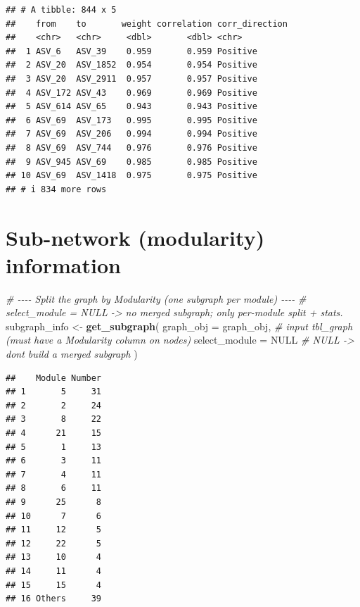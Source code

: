 \documentclass[
]{book}
\newenvironment{Shaded}{\begin{snugshade}}{\end{snugshade}}
\newcommand{\AttributeTok}[1]{\textcolor[rgb]{0.13,0.29,0.53}{#1}}
\newcommand{\CommentTok}[1]{\textcolor[rgb]{0.56,0.35,0.01}{\textit{#1}}}
\newcommand{\ConstantTok}[1]{\textcolor[rgb]{0.56,0.35,0.01}{#1}}
\newcommand{\FunctionTok}[1]{\textcolor[rgb]{0.13,0.29,0.53}{\textbf{#1}}}
\newcommand{\NormalTok}[1]{#1}
\newcommand{\OtherTok}[1]{\textcolor[rgb]{0.56,0.35,0.01}{#1}}
\begin{document}
\begin{verbatim}
## # A tibble: 844 x 5
##    from    to       weight correlation corr_direction
##    <chr>   <chr>     <dbl>       <dbl> <chr>         
##  1 ASV_6   ASV_39    0.959       0.959 Positive      
##  2 ASV_20  ASV_1852  0.954       0.954 Positive      
##  3 ASV_20  ASV_2911  0.957       0.957 Positive      
##  4 ASV_172 ASV_43    0.969       0.969 Positive      
##  5 ASV_614 ASV_65    0.943       0.943 Positive      
##  6 ASV_69  ASV_173   0.995       0.995 Positive      
##  7 ASV_69  ASV_206   0.994       0.994 Positive      
##  8 ASV_69  ASV_744   0.976       0.976 Positive      
##  9 ASV_945 ASV_69    0.985       0.985 Positive      
## 10 ASV_69  ASV_1418  0.975       0.975 Positive      
## # i 834 more rows
\end{verbatim}

\section{Sub-network (modularity) information}\label{sub-network-modularity-information}

\begin{Shaded}
\begin{Highlighting}[]
\CommentTok{\# {-}{-}{-}{-} Split the graph by \textasciigrave{}Modularity\textasciigrave{} (one subgraph per module) {-}{-}{-}{-}}
\CommentTok{\# \textasciigrave{}select\_module = NULL\textasciigrave{} {-}\textgreater{} no merged subgraph; only per{-}module split + stats.}
\NormalTok{subgraph\_info }\OtherTok{\textless{}{-}} \FunctionTok{get\_subgraph}\NormalTok{(}
  \AttributeTok{graph\_obj     =}\NormalTok{ graph\_obj,   }\CommentTok{\# input tbl\_graph (must have a \textasciigrave{}Modularity\textasciigrave{} column on nodes)}
  \AttributeTok{select\_module =} \ConstantTok{NULL}         \CommentTok{\# NULL {-}\textgreater{} don\textquotesingle{}t build a merged subgraph}
\NormalTok{)}
\end{Highlighting}
\end{Shaded}

\begin{verbatim}
##    Module Number
## 1       5     31
## 2       2     24
## 3       8     22
## 4      21     15
## 5       1     13
## 6       3     11
## 7       4     11
## 8       6     11
## 9      25      8
## 10      7      6
## 11     12      5
## 12     22      5
## 13     10      4
## 14     11      4
## 15     15      4
## 16 Others     39
\end{verbatim}
\end{document}
